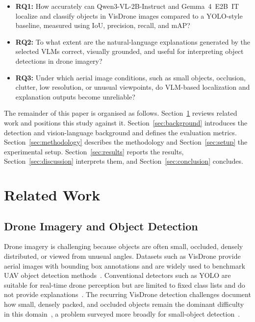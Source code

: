 \documentclass[acmtog, authorversion]{acmart}
\begin{document}
\begin{itemize}
  \item \textbf{RQ1:} How accurately can Qwen3-VL-2B-Instruct and
    Gemma~4~E2B~IT localize and classify objects in VisDrone images
    compared to a YOLO-style baseline, measured using IoU, precision,
    recall, and mAP?
  \item \textbf{RQ2:} To what extent are the natural-language
    explanations generated by the selected VLMs correct, visually
    grounded, and useful for interpreting object detections in drone
    imagery?
  \item \textbf{RQ3:} Under which aerial image conditions, such as
    small objects, occlusion, clutter, low resolution, or unusual
    viewpoints, do VLM-based localization and explanation outputs
    become unreliable?
\end{itemize}

The remainder of this paper is organised as follows.
Section~\ref{sec:related} reviews related work and positions this
study against it. Section~\ref{sec:background} introduces the
detection and vision-language background and defines the evaluation
metrics. Section~\ref{sec:methodology} describes the methodology and
Section~\ref{sec:setup} the experimental setup.
Section~\ref{sec:results} reports the results,
Section~\ref{sec:discussion} interprets them, and
Section~\ref{sec:conclusion} concludes.

\section{Related Work}
\label{sec:related}

\subsection{Drone Imagery and Object Detection}

Drone imagery is challenging because objects are often small,
occluded, densely distributed, or viewed from unusual angles.
Datasets such as VisDrone provide aerial images with bounding box
annotations and are widely used to benchmark UAV object detection
methods~\cite{zhu2018visdrone}. Conventional detectors such as YOLO
are suitable for real-time drone perception but are limited to fixed
class lists and do not provide explanations~\cite{redmon2016yolo}.
The recurring VisDrone detection challenges document how small,
densely packed, and occluded objects remain the dominant difficulty in
this domain~\cite{cao2021visdrone}, a problem surveyed more broadly for
small-object detection~\cite{nikouei2025sod}.
\end{document}
